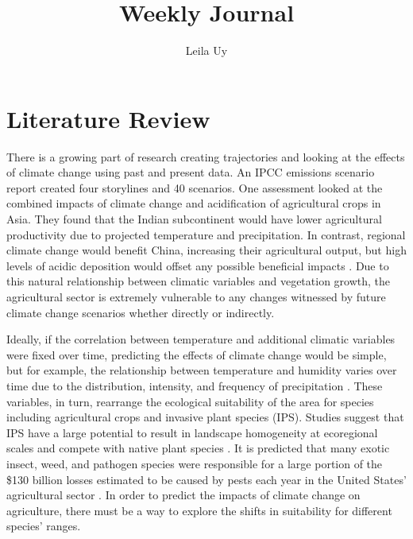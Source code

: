 \documentclass[a4paper,10pt]{article}
\title{Weekly Journal}
\author{Leila Uy}
\begin{document}
\maketitle

% 

\section{Literature Review}
There is a growing part of research creating trajectories and looking at the effects of climate change 
using past and present data. An IPCC emissions scenario report created four storylines and 40 scenarios.  
One assessment looked at the combined impacts of climate change and acidification of agricultural crops 
in Asia. They found that the Indian subcontinent would have lower agricultural productivity due to 
projected temperature and precipitation. In contrast, regional climate change would benefit China, 
increasing their agricultural output, but high levels of acidic deposition would offset any possible 
beneficial impacts \cite{IPCC2000emissions}. Due to this natural relationship between climatic variables and 
vegetation growth, the agricultural sector is extremely vulnerable to any changes witnessed by future climate 
change scenarios whether directly or indirectly. 

Ideally, if the correlation between temperature and additional climatic variables were fixed over time, predicting 
the effects of climate change would be simple, but for example, the relationship between temperature and humidity 
varies over time due to the distribution, intensity, and frequency of precipitation \cite{peng2017economic}. These 
variables, in turn, rearrange the ecological suitability of the area for species including agricultural crops and 
invasive plant species (IPS). Studies suggest that IPS have a large potential to result in landscape homogeneity at 
ecoregional scales and compete with native plant species \cite{wang2019potential}. It is predicted that many exotic 
insect, weed, and pathogen species were responsible for a large portion of the \$130 billion losses estimated to be 
caused by pests each year in the United States' agricultural sector \cite{carruthers2003invasive}. In order to 
predict the impacts of climate change on agriculture, there must be a way to explore the shifts in suitability for 
different species' ranges. 
\end{document}
